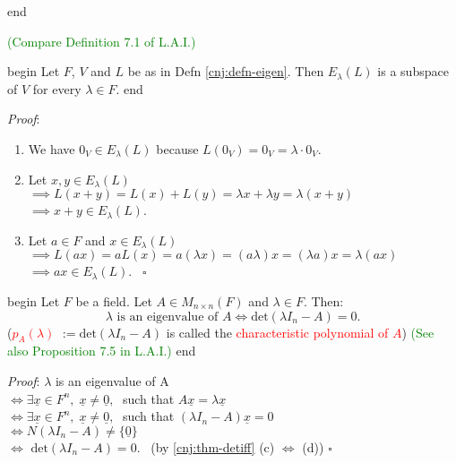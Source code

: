 \documentclass[
  12pt,
  a4paper,
  twoside]{article}
\providecommand{\tightlist}{%
  \setlength{\itemsep}{0pt}\setlength{\parskip}{0pt}}
\theoremstyle{plain}
\theoremstyle{definition}
\begin{document}
\csname end

\textcolor{green}{(Compare Definition 7.1 of L.A.I.)}

\csname begin\label{cnj:prop-eigen-subspace}
Let \(F\), \(V\) and \(L\) be as in Defn \ref{cnj:defn-eigen}. Then \(E_{\lambda}(L)\) is a subspace of \(V\) for every \(\lambda \in F\).
\csname end

\emph{Proof}:

\begin{enumerate}
\def\labelenumi{(\alph{enumi})}
\tightlist
\item
  We have \(0_{V} \in E_{\lambda}(L)\) because \(L(0_{V}) = 0_{V} = \lambda \cdot 0_{V}\).
\item
  Let \(x,y \in E_{\lambda} (L)\)\\
  \(\implies L(x+y) = L(x) + L(y) = \lambda x + \lambda y = \lambda(x+y)\)\\
  \(\implies x + y \in E_{\lambda}(L)\).
\item
  Let \(a \in F\) and \(x \in E_{\lambda }(L)\)\\
  \(\implies L(ax) = aL(x) = a(\lambda x) = (a \lambda)x = (\lambda a)x = \lambda(ax)\)\\
  \(\implies ax \in E_{\lambda}(L)\).
  \hfill~{\(\square\)}
\end{enumerate}

\csname begin\label{cnj:prop-charpoly}
Let \(F\) be a field. Let \(A \in M_{n \times n} (F)\) and \(\lambda \in F\). Then:
\[\lambda \text{ is an eigenvalue of }
A \iff \mathrm{det}(\lambda I_{n} - A) = 0. \]
(\textcolor{red}{$p_A(\lambda)$} \(:= \mathrm{det}(\lambda I_{n} - A)\) is called the \textcolor{red}{characteristic polynomial of $A$}) \textcolor{green}{(See also Proposition 7.5 in L.A.I.)}
\csname end

\emph{Proof}:
\(\lambda\) is an eigenvalue of A\\
\(\iff \exists \underline{x} \in F^{n}, \; \underline{x} \neq \underline{0},\;\) such that \(A \underline{x} = \lambda \underline{x}\)\\
\(\iff \exists \underline{x} \in F^{n}, \; \underline{x} \neq \underline{0}, \;\) such that \((\lambda I_{n} - A) \underline{x} = 0\)\\
\(\iff N(\lambda I_{n} - A) \neq \{ \underline{0} \}\)\\
\(\iff\) \(\mathrm{det}(\lambda I_{n} - A) = 0\). \hfill~{(by \ref{cnj:thm-detiff} (c) \(\iff\) (d)) \(\square\)}
\end{document}
